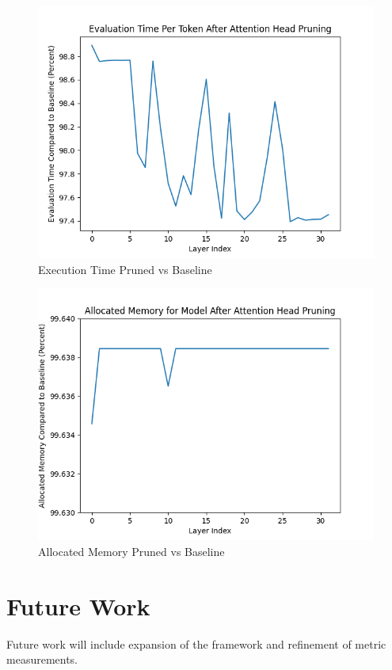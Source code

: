 \documentclass[conference]{IEEEtran}
\begin{document}
    \begin{figure}[!htbp]
        \centerline{\includegraphics[width=1.0\columnwidth]{time}}
        \caption{Execution Time Pruned vs Baseline}
        \label{fig:time}
    \end{figure}

    \begin{figure}[!htbp]
        \centerline{\includegraphics[width=1.0\columnwidth]{memory}}
        \caption{Allocated Memory Pruned vs Baseline}
        \label{fig:memory}
    \end{figure}

    \section{Future Work}
    Future work will include expansion of the framework and refinement of metric measurements.
\end{document}
